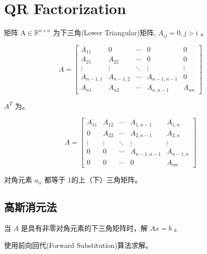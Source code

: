 \chapter{QR Factorization}

\begin{definition}
    矩阵 $ \mathrm{A} \in \mathbb{R}^{n \times n} $ 为下三角(Lower Triangular)矩阵, $ A_{i j}=0, j>i $ 。

    $$ A=\left[\begin{array}{ccccc}A_{11} & 0 & \cdots & 0 & 0 \\ A_{21} & A_{22} & \cdots & 0 & 0 \\ \vdots & \vdots & \ddots & \vdots & \vdots \\ A_{n-1,1} & A_{n-1,2} & \cdots & A_{n-1, n-1} & 0 \\ A_{n 1} & A_{n 2} & \cdots & A_{n, n-1} & A_{n n}\end{array}\right] $$
\end{definition}

\begin{definition}
    $ A^{T} $ 为。

    $$ A=\left[\begin{array}{ccccc}A_{11} & A_{12} & \cdots & A_{1, n-1} & A_{1, n} \\ 0 & A_{22} & \cdots & A_{2, n-1} & A_{2, n} \\ \vdots & \vdots & \ddots & \vdots & \vdots \\ 0 & 0 & \cdots & A_{n-1, n-1} & A_{n-1, n} \\ 0 & 0 & \cdots & 0 & A_{n n}\end{array}\right] $$
\end{definition}

\begin{definition}
    对角元素 $ a_{i i} $ 都等于 1的上（下）三角矩阵。
\end{definition}

\section{高斯消元法}

\begin{problem}
    当 $ A $ 是具有非零对角元素的下三角矩阵时，解 $ A x=b $ 。
\end{problem}

使用前向回代(Forward Substitution)算法求解。

